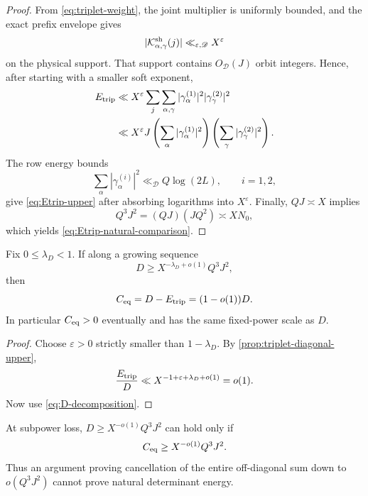 \begin{proof}
From \eqref{eq:triplet-weight}, the joint multiplier is uniformly
bounded, and the exact prefix envelope gives
\[
 |\mathcal K_{\alpha,\gamma}^{\rm sh}(j)|
 \ll_{\varepsilon,\mathscr D}X^\varepsilon
\]
on the physical support.  That support contains
\(O_{\mathscr D}(J)\) orbit integers.  Hence, after starting with a
smaller soft exponent,
\begin{align*}
 E_{\mathrm{trip}}
 &\ll X^\varepsilon
 \sum_j\sum_{\alpha,\gamma}
 |\gamma_\alpha^{(1)}|^2
 |\gamma_\gamma^{(2)}|^2\\
 &\ll X^\varepsilon J
 \left(\sum_\alpha|\gamma_\alpha^{(1)}|^2\right)
 \left(\sum_\gamma|\gamma_\gamma^{(2)}|^2\right).
\end{align*}
The row energy bounds
\[
 \sum_\alpha|\gamma_\alpha^{(i)}|^2
 \ll_{\mathscr D}Q\log(2L),\qquad i=1,2,
\]
give \eqref{eq:Etrip-upper} after absorbing logarithms into
\(X^\varepsilon\).  Finally, \(QJ\asymp X\) implies
\[
 Q^3J^2=(QJ)(JQ^2)\asymp XN_0,
\]
which yields \eqref{eq:Etrip-natural-comparison}.
\end{proof}

\begin{theorem}
\label{thm:positive-coherence-necessary}
Fix \(0\le\lambda_D<1\).  If along a growing sequence
\begin{equation}
 D\ge X^{-\lambda_D+o(1)}Q^3J^2,
\label{eq:D-fixed-loss-lower}
\end{equation}
then
\begin{equation}
 C_{\mathrm{eq}}=D-E_{\mathrm{trip}}=(1-o(1))D.
\label{eq:Ceq-dominates}
\end{equation}
In particular \(C_{\mathrm{eq}}>0\) eventually and has the same
fixed-power scale as \(D\).
\end{theorem}

\begin{proof}
Choose \(\varepsilon>0\) strictly smaller than
\(1-\lambda_D\).  By \cref{prop:triplet-diagonal-upper},
\[
 \frac{E_{\mathrm{trip}}}{D}
 \ll
 X^{-1+\varepsilon+\lambda_D+o(1)}
 =o(1).
\]
Now use \eqref{eq:D-decomposition}.
\end{proof}

\begin{corollary}
\label{cor:natural-energy-offdiagonal}
At subpower loss, \(D\ge X^{-o(1)}Q^3J^2\) can hold only if
\[
 C_{\mathrm{eq}}\ge X^{-o(1)}Q^3J^2.
\]
Thus an argument proving cancellation of the entire off-diagonal sum
down to \(o(Q^3J^2)\) cannot prove natural determinant energy.
\end{corollary}

